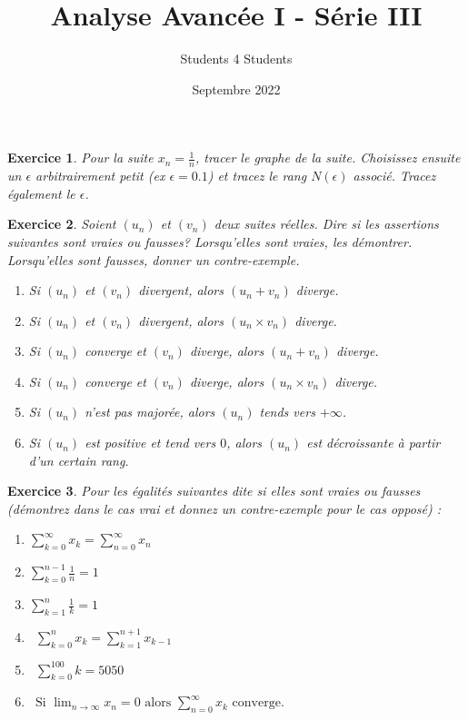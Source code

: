 \documentclass[11pt,french,table]{article}
\title{Analyse Avancée I - Série III}
\author{Students 4 Students}
\date{Septembre 2022}
\theoremstyle{exercice}
\newtheorem{exercice}{Exercice}
\begin{document}
\maketitle

\begin{exercice}
Pour la suite $x_n=\frac{1}{n}$, tracer le graphe de la suite. Choisissez ensuite un $\epsilon$ arbitrairement petit (ex $\epsilon=0.1$) et tracez le rang $N(\epsilon)$ associé. Tracez également le $\epsilon$.
\end{exercice}
\vspace{1em}
\begin{exercice}
Soient $(u_n)$ et $(v_n)$ deux suites réelles. Dire si les assertions suivantes sont vraies ou fausses? Lorsqu'elles sont vraies, les démontrer. Lorsqu'elles sont fausses, donner un contre-exemple. 
\begin{enumerate}
    \item Si $(u_n)$ et $(v_n)$ divergent, alors $(u_n+v_n)$ diverge. 
    \item Si $(u_n)$ et $(v_n)$ divergent, alors $(u_n \times v_n)$ diverge. 
    \item Si $(u_n)$ converge et $(v_n)$ diverge, alors $(u_n+v_n)$ diverge.
    \item Si $(u_n)$ converge et $(v_n)$ diverge, alors $(u_n\times v_n)$ diverge. 
    \item Si $(u_n)$ n'est pas majorée, alors $(u_n)$ tends vers $+\infty$. 
    \item Si $(u_n)$ est positive et tend vers $0$, alors $(u_n)$ est décroissante à partir d'un certain rang. 
\end{enumerate}
\end{exercice}
\vspace{1em}
\begin{exercice}
Pour les égalités suivantes dite si elles sont vraies ou fausses (démontrez dans le cas vrai et donnez un contre-exemple pour le cas opposé) : 
\begin{enumerate}
  
\begin{multicols}{2}
    \begin{enumerate}
     \item[(a)]  $\sum_{k=0}^{\infty}x_k= \sum_{n=0}^{\infty} x_n $\\
     \item[(b)]  $\sum_{k=0}^{n-1} \frac{1}{n}=1$ \\
     \item[(c)]  $\sum_{k=1}^{n} \frac{1}{k}=1$ \\
     \columnbreak
     \item[(d)]  \ $\sum_{k=0}^n x_k=\sum_{k=1}^{n+1} x_{k-1}$ \\
     \item[(e)]  \ $\sum_{k=0}^{100}k=5050$ \\
     \item[(f)]  \ $\text{Si } \lim_{n\xrightarrow{}\infty} x_n =0 \text{ alors } \sum_{n=0}^{\infty} x_k \text{ converge.}$
\end{enumerate}
\end{multicols}
\end{enumerate}
\end{exercice}
\end{document}
